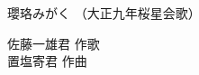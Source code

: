 \documentclass[10pt,b5j]{tarticle} %
\begin{document}
\begin{minipage}[c]{0.7\hsize} %
    \begin{center}
        {\LARGE
            瓔珞みがく %
        }
        {\small 
            （大正九年桜星会歌） %
        }
    \end{center}
\end{minipage}
\begin{minipage}[c]{0.3\hsize} %
    \begin{flushright} %
        佐藤一雄君 作歌\\置塩寄君 作曲 %
    \end{flushright}
\end{minipage}
\end{document}
